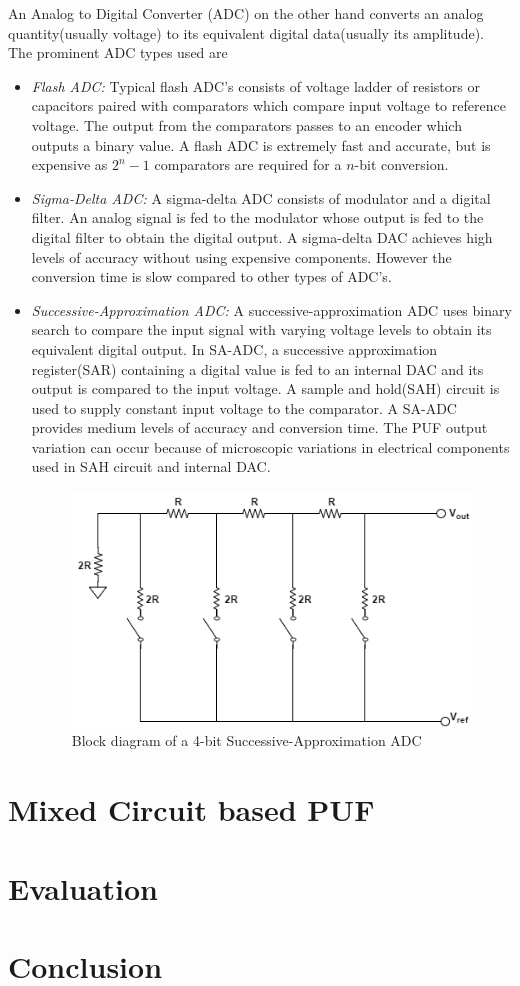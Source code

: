 An Analog to Digital Converter (ADC) on the other hand converts an analog quantity(usually voltage) to its equivalent digital data(usually its amplitude). The prominent ADC types used are
\begin{itemize}
\item \textit{Flash ADC:} Typical flash ADC's consists of voltage ladder of resistors or capacitors paired with comparators which compare input voltage to reference voltage. The output from the comparators passes to an encoder which outputs a binary value. A flash ADC is extremely fast and accurate, but is expensive as $2^{n}-1$ comparators are required for a $n$-bit conversion.
\item \textit{Sigma-Delta ADC:} A sigma-delta ADC consists of modulator and a digital filter. An analog signal is fed to the modulator whose output is fed to the digital filter to obtain the digital output. A sigma-delta DAC achieves high levels of accuracy without using expensive components. However the conversion time is slow compared to other types of ADC's.
\item \textit{Successive-Approximation ADC:} A successive-approximation ADC uses binary search to compare the input signal with varying voltage levels to obtain its equivalent digital output. In SA-ADC, a successive approximation register(SAR) containing a digital value is fed to an internal DAC and its output is compared to the input voltage. A sample and hold(SAH) circuit is used to supply constant input voltage to the comparator. A SA-ADC provides medium levels of accuracy and conversion time. The PUF output variation can occur because of microscopic variations in electrical components used in SAH circuit and internal DAC.
\begin{figure}[H]
\includegraphics[scale=0.8]{SA-ADC.png}
\centering
\caption{Block diagram of a 4-bit Successive-Approximation ADC}
\end{figure}
\end{itemize}

\section{Mixed Circuit based PUF}


\section{Evaluation}

\section{Conclusion}

